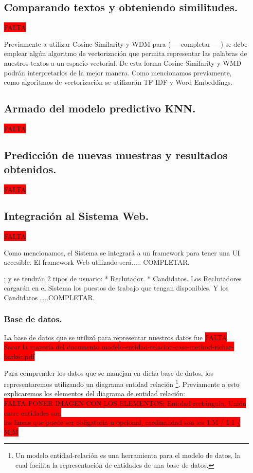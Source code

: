 \documentclass[12pt,a4paper]{article}
\begin{document}
\subsection{Comparando textos y obteniendo similitudes.}
\colorbox{red}{FALTA}

Previamente a utilizar Cosine Similarity y WDM para (-----completar-----) se debe emplear algún algoritmo de vectorización que permita representar las palabras de nuestros textos a un espacio vectorial. De esta forma Cosine Similarity y WMD podrán interpretarlos de la mejor manera. 
Como mencionamos previamente, como algoritmos de vectorización se utilizarán TF-IDF y Word Embeddings.


\subsection{Armado del modelo predictivo KNN.}
\colorbox{red}{FALTA}

\subsection{Predicción de nuevas muestras y resultados obtenidos.}
\colorbox{red}{FALTA}

\subsection{Integración al Sistema Web.}
\colorbox{red}{FALTA}

Como mencionamos, el Sistema se integrará a un framework para tener una UI accesible.
El framework Web utilizado será..... COMPLETAR.


; y se tendrán 2 tipos de usuario: 
*  Reclutador. 
*  Candidatos.
Los Reclutadores cargarán en el Sistema los puestos de trabajo que tengan disponibles.
Y los Candidatos …..COMPLETAR.


\subsubsection{Base de datos.}

La base de datos que se utilizó para representar nuestros datos fue \colorbox{red}{FALTA}. \\
\colorbox{red}{Sacar la mayoría del documento modelo-entidad-relacion-case-method-richar-barker.pdf} 
     
Para comprender los datos que se manejan en dicha base de datos, los representaremos utilizando un diagrama entidad relación \footnote{Un modelo entidad-relación es una herramienta para el modelo de datos, la cual facilita la representación de entidades de una base de datos.}.
Previamente a esto explicaremos los elementos del diagrama de entidad relación: \\
\colorbox{red}{FALTA PONER IMAGEN CON LOS ELEMENTOS: Entidad rectángulo, Unión entre entidades son} \\ \colorbox{red}{las lineas que puede ser obligatoria u opcional, cardinalidad son los 1:M / 1:1 / M:M}
\end{document}
